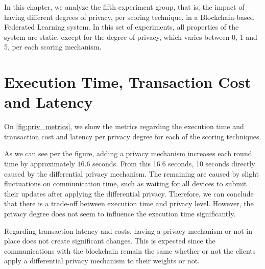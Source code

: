 In this chapter, we analyze the fifth experiment group, that is, the impact of having different degrees of privacy, per scoring technique, in a Blockchain-based Federated Learning system. In this set of experiments, all properties of the system are static, except for the degree of privacy, which varies between 0, 1 and 5, per each scoring mechanism.

\section{Execution Time, Transaction Cost and Latency}

On \autoref{fig:priv_metrics}, we show the metrics regarding the execution time and transaction cost and latency per privacy degree for each of the scoring techniques.

As we can see per the figure, adding a privacy mechanism increases each round time by approximately $16.6$ seconds. From this 16.6 seconds, 10 seconds directly caused by the differential privacy mechanism. The remaining are caused by slight fluctuations on communication time, such as waiting for all devices to submit their updates after applying the differential privacy. Therefore, we can conclude that there is a trade-off between execution time and privacy level. However, the privacy degree does not seem to influence the execution time significantly.

Regarding transaction latency and costs, having a privacy mechanism or not in place does not create significant changes. This is expected since the communications with the blockchain remain the same whether or not the clients apply a differential privacy mechanism to their weights or not. 

